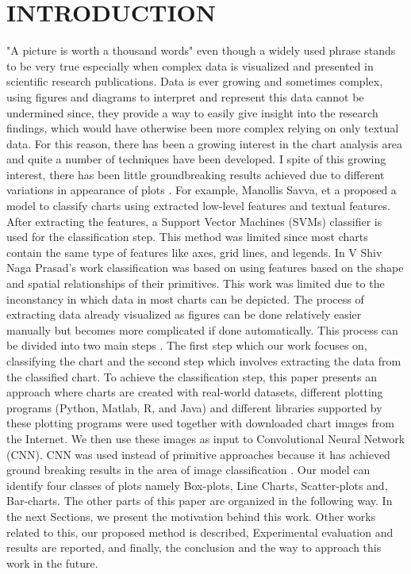 \documentclass[12pt, a4paper,oneside]{report}
\begin{document}
\chapter{INTRODUCTION}
"A picture is worth a thousand words" even though a widely used phrase stands to be very true especially when complex data is visualized and presented in scientific research publications. 
Data is ever growing and sometimes complex, using figures and diagrams to interpret and represent this data cannot be undermined since, they provide a way to easily give insight into the research findings, which would have otherwise been more complex relying on  only textual data. For this reason, there has been a growing interest in the chart analysis area and quite a number of techniques have been developed. I spite of this growing interest, there has been little groundbreaking results achieved due to different variations in appearance of plots \cite{liu2015chart}.
For example, Manollis Savva, et a \cite{savva2011revision} proposed a model to classify charts using extracted low-level features and textual features. After extracting the features, a  Support Vector Machines (SVMs) classifier is used for the classification step. This method was limited since most charts contain the same type of features like axes, grid lines, and legends.
In V Shiv Naga Prasad's work \cite{prasad2007classifying} classification was based on using features based on the shape and spatial relationships of their primitives. This work was limited due to the inconstancy in which data in most charts can be depicted.
The process of extracting data already visualized as figures can be done relatively easier manually but becomes more complicated if done automatically. This process can be divided into two main steps \cite{savva2011revision}. The first step which our work focuses on, classifying the chart and the second step which involves extracting the data from the classified chart.
To achieve the classification step, this paper presents an approach where charts are created with real-world datasets, different plotting programs (Python, Matlab, R, and Java) and different libraries supported by these plotting programs were used together with downloaded chart images from the Internet. We then use these images as input to Convolutional Neural Network (CNN). CNN was used instead of primitive approaches because it has achieved ground breaking results in the area of image classification \cite{amara2017convolutional}. Our model can identify four classes of plots namely Box-plots, Line Charts, Scatter-plots and, Bar-charts.
The other parts of this paper are organized in the following way. 
In the next Sections, we present the motivation behind this work. Other works related to this,  our proposed method is described,
Experimental evaluation and results are reported, and finally, the conclusion and the way to approach this work in the future.
\end{document}
